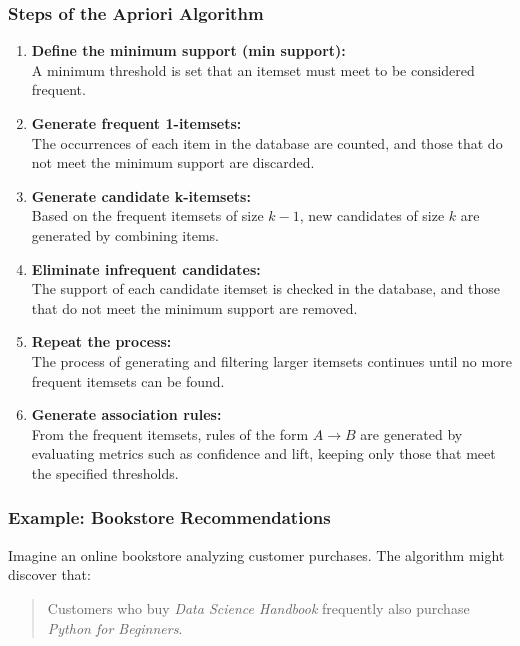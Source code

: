 \documentclass[runningheads]{llncs}
\begin{document}
\subsubsection{Steps of the Apriori Algorithm}

\begin{enumerate}
	\item \textbf{Define the minimum support (min support):} \\
	A minimum threshold is set that an itemset must meet to be considered frequent.
	
	\item \textbf{Generate frequent 1-itemsets:} \\
	The occurrences of each item in the database are counted, and those that do not meet the minimum support are discarded.
	
	\item \textbf{Generate candidate k-itemsets:} \\
	Based on the frequent itemsets of size \(k-1\), new candidates of size \(k\) are generated by combining items.
	
	\item \textbf{Eliminate infrequent candidates:} \\
	The support of each candidate itemset is checked in the database, and those that do not meet the minimum support are removed.
	
	\item \textbf{Repeat the process:} \\
	The process of generating and filtering larger itemsets continues until no more frequent itemsets can be found.
	
	\item \textbf{Generate association rules:} \\
	From the frequent itemsets, rules of the form \(A \rightarrow B\) are generated by evaluating metrics such as confidence and lift, keeping only those that meet the specified thresholds.
\end{enumerate}
\subsubsection{Example: Bookstore Recommendations}

Imagine an online bookstore analyzing customer purchases. The algorithm might discover that:

\begin{quote}
	Customers who buy \textit{Data Science Handbook} frequently also purchase \textit{Python for Beginners}.
\end{quote}
\end{document}
